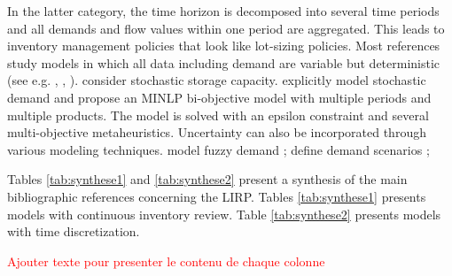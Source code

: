 \documentclass[a4paper,10pt]{article}
\begin{document}
\begin{linenumbers}
In the latter category, the time horizon is decomposed into several time periods and all demands and flow values within one period are aggregated. This leads to inventory management policies that look like lot-sizing policies. Most references study models in which all data including demand are variable but deterministic (see e.g. \cite{Guerrero2013}, \cite{Zhang2014}, \cite{Ghorbani2016}). 
\cite{Vahdani2018} consider stochastic storage capacity. 
\cite{Rayat2017} explicitly model stochastic demand and propose an MINLP bi-objective model with multiple periods and multiple products. The model is solved with an epsilon constraint and several multi-objective metaheuristics. 
Uncertainty can also be incorporated through various modeling techniques. 
\cite{ChenChenSunLiu2014, TavakkoliIFAC2016} model fuzzy demand ; \cite{Bashiri2018} define demand scenarios ; 



Tables \ref{tab:synthese1} and \ref{tab:synthese2} present a synthesis of the main bibliographic references concerning the LIRP. 
Tables \ref{tab:synthese1} presents models with continuous inventory review. 
Table \ref{tab:synthese2} presents models with time discretization. 

\textcolor{red}{Ajouter texte pour presenter le contenu de chaque colonne}


\end{linenumbers}
\end{document}
